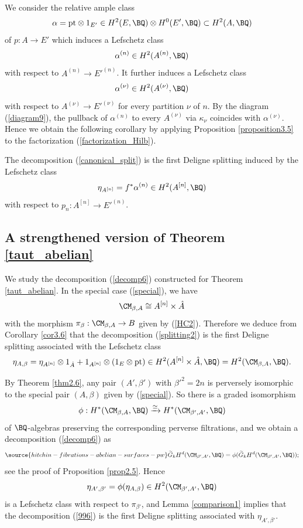 We consider the relative ample class
\[
\alpha = \mathrm{pt} \otimes 1_{E'} \in H^2(E, \BQ)\otimes H^0(E', \BQ) \subset H^2(A, \BQ)
\]
of $p:A \to E'$ which induces a Lefschetz class
\[
\alpha^{(n)} \in H^2(A^{(n)}, \BQ)
\]
with respect to $A^{(n)} \to E'^{(n)}$. It further induces a Lefschetz class
\[
\alpha^{(\nu)} \in H^2(A^{(\nu)}, \BQ)
\]
with respect to $A^{(\nu)} \to E'^{(\nu)}$ for every partition $\nu$ of $n$. By the diagram (\ref{diagram9}), the pullback of $\alpha^{(n)}$ to every $A^{(\nu)}$ via $\kappa_\nu$ coincides with $\alpha^{(\nu)}$. Hence we obtain the following corollary by applying Proposition \ref{proposition3.5} to the factorization (\ref{factorization_Hilb}).

\begin{cor}
\notready\label{cor3.6}
The decomposition (\ref{canonical_split}) is the first Deligne splitting induced by the Lefschetz class
\[
\eta_{A^{[n]}} = f^*\alpha^{(n)} \in H^2(A^{[n]}, \BQ)
\]
with respect to $p_n: A^{[n]} \to E'^{(n)}$.
\end{cor}

\subsection{A strengthened version of Theorem \ref{taut_abelian}}\label{Section3.5}
We study the decomposition (\ref{decomp6}) constructed for Theorem \ref{taut_abelian}. In the special case (\ref{special}), we have
\[
\CM_{\beta, A} \cong A^{[n]} \times \hat{A}
\]
with the morphism $\pi_\beta: \CM_{\beta,A} \to B$ given by (\ref{HC2}). Therefore we deduce from Corollary \ref{cor3.6} that the decomposition (\ref{splitting2}) is the first Deligne splitting associated with the Lefschetz class
\[
\eta_{A,\beta} = \eta_{A^{[n]}} \otimes 1_{\hat{A}} + 1_{A^{[n]}}\otimes \left(1_E \otimes \mathrm{pt} \right) \in H^2(A^{[n]} \times \hat{A}, \BQ) =  H^2(\CM_{\beta, A}, \BQ).
\]

By Theorem \ref{thm2.6}, any pair $(A', \beta')$ with $\beta'^2=2n$ is perversely isomorphic to the special pair $(A, \beta)$ given by (\ref{special}). So there is a graded isomorphism
\[
\phi: H^*(\CM_{\beta, A}, \BQ) \xrightarrow{\simeq} H^*(\CM_{\beta', A'}, \BQ)
\]
of $\BQ$-algebras preserving the corresponding perverse filtrations, and we obtain a decomposition (\ref{decomp6}) as
\begin{equation}\label{996}
\source{hitchin-fibrations-abelian-surfaces-pw}
\widetilde{G}_kH^d(\CM_{\beta',A'}, \BQ) = \phi(\widetilde{G}_kH^d(\CM_{\beta',A'}, \BQ));
\end{equation}
see the proof of Proposition \ref{prop2.5}. Hence
\[
\eta_{A',\beta'} = \phi(\eta_{A,\beta}) \in H^2(\CM_{\beta',A'}, \BQ)
\]
is a Lefschetz class with respect to $\pi_{\beta'}$, and Lemma \ref{comparison1} implies that the decomposition (\ref{996}) is the first Deligne splitting associated with $\eta_{A',\beta'}$.

